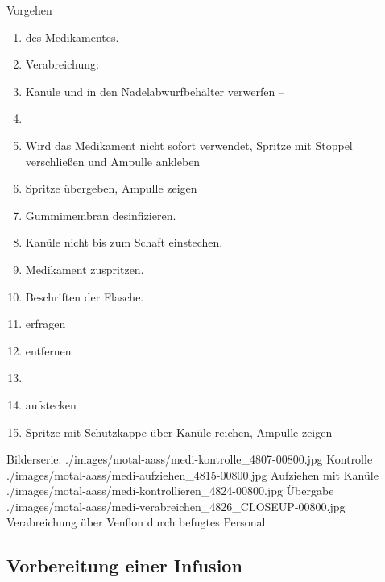 \begin{ProcedureStepsWide}{Vorgehen}
\begin{enumerate}
  Beim Einführen der Kanüle in die Ampulle den
    Ampullenrand nicht berühren.
  \item {} des
  Medikamentes.
  \item Verabreichung:
    \item Kanüle  und in den
    Nadelabwurfbehälter verwerfen -- 
    \item {}
    \item Wird das Medikament nicht sofort verwendet, Spritze mit
    Stoppel verschließen und Ampulle ankleben
    \item Spritze übergeben, Ampulle zeigen
    \item Gummimembran desinfizieren.
    \item Kanüle nicht bis zum Schaft einstechen.
    \item Medikament zuspritzen.
    \item Beschriften der Flasche.
    \item {} erfragen
    \item {}  entfernen
    \item {}
    \item {} aufstecken
    \item Spritze mit Schutzkappe über Kanüle reichen, Ampulle zeigen
\end{enumerate}
\end{ProcedureStepsWide}


\begin{PictureSeriesWide}{}{Bilderserie:  }
{./images/motal-aass/medi-kontrolle_4807-00800.jpg}
{Kontrolle}
{./images/motal-aass/medi-aufziehen_4815-00800.jpg}
{Aufziehen mit Kanüle}
{./images/motal-aass/medi-kontrollieren_4824-00800.jpg}
{Übergabe}
{./images/motal-aass/medi-verabreichen_4826_CLOSEUP-00800.jpg}
{Verabreichung über Venflon durch befugtes Personal}
\end{PictureSeriesWide}



\subsection{Vorbereitung einer Infusion}
\label{topic:infusion}

